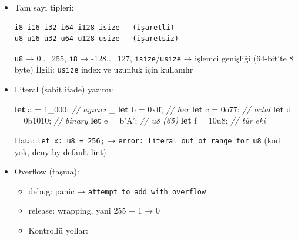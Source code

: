 \documentclass[12pt,a4paper]{article}
\newenvironment{Shaded}{}{}
\newcommand{\BaseNTok}[1]{\textcolor[rgb]{0.25,0.63,0.44}{#1}}
\newcommand{\CharTok}[1]{\textcolor[rgb]{0.25,0.44,0.63}{#1}}
\newcommand{\CommentTok}[1]{\textcolor[rgb]{0.38,0.63,0.69}{\textit{#1}}}
\newcommand{\DecValTok}[1]{\textcolor[rgb]{0.25,0.63,0.44}{#1}}
\newcommand{\KeywordTok}[1]{\textcolor[rgb]{0.00,0.44,0.13}{\textbf{#1}}}
\newcommand{\NormalTok}[1]{#1}
\newcommand{\OperatorTok}[1]{\textcolor[rgb]{0.40,0.40,0.40}{#1}}
\begin{document}
\begin{itemize}
\item
  Tam sayı tipleri:

\begin{verbatim}
i8 i16 i32 i64 i128 isize   (işaretli)
u8 u16 u32 u64 u128 usize   (işaretsiz)
\end{verbatim}


  \texttt{u8} → 0..=255, \texttt{i8} → -128..=127, \texttt{isize}/\texttt{usize} → işlemci genişliği (64-bit'te 8 byte)
  İlgili: \texttt{usize} index ve uzunluk için kullanılır
\item
  Literal (sabit ifade) yazımı:

\begin{Shaded}
\begin{Highlighting}[]
\KeywordTok{let}\NormalTok{ a }\OperatorTok{=} \DecValTok{1\_}\DecValTok{000}\OperatorTok{;}     \CommentTok{// ayırıcı \_}
\KeywordTok{let}\NormalTok{ b }\OperatorTok{=} \BaseNTok{0xff}\OperatorTok{;}      \CommentTok{// hex}
\KeywordTok{let}\NormalTok{ c }\OperatorTok{=} \BaseNTok{0o77}\OperatorTok{;}      \CommentTok{// octal}
\KeywordTok{let}\NormalTok{ d }\OperatorTok{=} \BaseNTok{0b1010}\OperatorTok{;}    \CommentTok{// binary}
\KeywordTok{let}\NormalTok{ e }\OperatorTok{=}\NormalTok{ b}\CharTok{'A'}\OperatorTok{;}      \CommentTok{// u8 (65)}
\KeywordTok{let}\NormalTok{ f }\OperatorTok{=} \DecValTok{10u}\DecValTok{8}\OperatorTok{;}      \CommentTok{// tür eki}
\end{Highlighting}
\end{Shaded}


  Hata: \texttt{let\ x:\ u8\ =\ 256;} → \texttt{error:\ literal\ out\ of\ range\ for\ u8} (kod yok, deny-by-default lint)
\item
  Overflow (taşma):

  \begin{itemize}
  \tightlist
  \item
    debug: panic → \texttt{attempt\ to\ add\ with\ overflow}
  \item
    release: wrapping, yani 255 + 1 → 0
  \item
    Kontrollü yollar:


\end{itemize}
\end{itemize}
\end{document}

